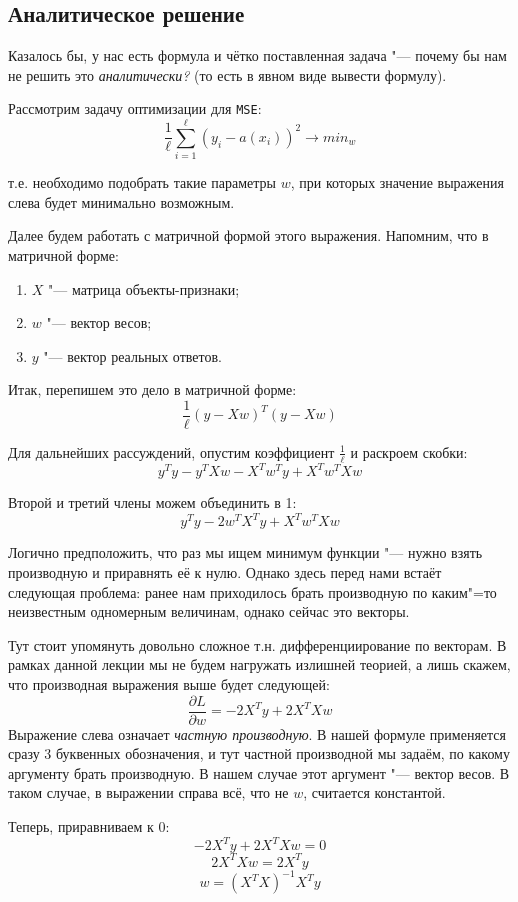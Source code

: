 \subsection*{Аналитическое решение}

Казалось бы, у нас есть формула и чётко поставленная задача "--- почему бы нам не решить это \textit{аналитически?} (то есть в явном виде вывести формулу).

Рассмотрим задачу оптимизации для \texttt{MSE}:
\[
\frac{1}{\ell} \sum_{i=1}^\ell (y_i - a(x_i))^2 \rightarrow min_{w}
\]

т.е. необходимо подобрать такие параметры $w$, при которых значение выражения слева будет минимально возможным.

Далее будем работать с матричной формой этого выражения. Напомним, что в матричной форме:
\begin{enumerate}
    \item $X$ "--- матрица объекты-признаки;
    \item $w$ "--- вектор весов;
    \item $y$ "--- вектор реальных ответов.
\end{enumerate}

Итак, перепишем это дело в матричной форме:
\[
\frac{1}{\ell} (y - Xw)^T (y - Xw)
\]

Для дальнейших рассуждений, опустим коэффициент $\frac{1}{\ell}$
и раскроем скобки:
\[
y^Ty - y^TXw - X^Tw^Ty + X^Tw^TXw
\]

Второй и третий члены можем объединить в 1:
\[
y^Ty - 2w^TX^Ty + X^Tw^TXw
\]

Логично предположить, что раз мы ищем минимум функции "--- нужно взять производную и приравнять её к нулю. Однако здесь перед нами встаёт следующая проблема: ранее нам приходилось брать производную по каким"=то неизвестным одномерным величинам, однако сейчас это векторы.

Тут стоит упомянуть довольно сложное т.н. дифференциирование по векторам. В рамках данной лекции мы не будем нагружать излишней теорией, а лишь скажем, что производная выражения выше будет следующей:
\[
\frac{ \partial L }{ \partial w } = -2X^Ty + 2X^TXw
\]
Выражение слева означает \textit{частную производную}. В нашей формуле применяется сразу 3 буквенных обозначения, и тут частной производной мы задаём, по какому аргументу брать производную. В нашем случае этот аргумент "--- вектор весов. В таком случае, в выражении справа всё, что не $w$, считается константой.

Теперь, приравниваем к $0$:
\[
-2X^Ty + 2X^TXw = 0
\]
\[
2X^TXw = 2X^Ty
\]
\[
w = (X^TX)^{-1}X^Ty
\]

